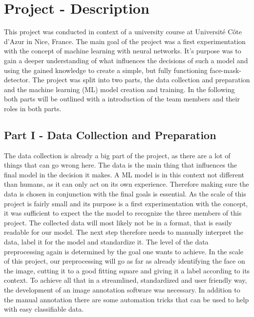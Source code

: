 
\section{Project - Description}

This project was conducted in context of a university course at Université Côte
d'Azur in Nice, France. The main goal of the project was a first experimentation
with the concept of machine learning with neural networks. It's purpose was to
gain a deeper understanding of what influences the decisions of such a model and
using the gained knowledge to create a simple, but fully functioning
face-mask-detector.
\newline
The project was split into two parts, the data collection and preparation and
the machine learning (ML) model creation and training. In the following both
parts will be outlined with a introduction of the team members and their roles
in both parts.

\subsection{Part I - Data Collection and Preparation}

The data collection is already a big part of the project, as there are a lot of
things that can go wrong here. The data is the main thing that influences the
final model in the decision it makes. A ML model is in this context not
different than humans, as it can only act on its own experience. Therefore
making sure the data is chosen in conjunction with the final goals is essential.
As the scale of this project is fairly small and its purpose is a first
experimentation with the concept, it was sufficient to expect the the model to
recognize the three members of this project.
\newline
The collected data will most likely not be in a format, that is easily readable
for our model. The next step therefore needs to manually interpret the data,
label it for the model and standardize it. The level of the data preprocessing
again is determined by the goal one wants to achieve. In the scale of this
project, our preprocessing will go as far as already identifying the face on the
image, cutting it to a good fitting square and giving it a label according to
its context.
\newline
To achieve all that in a streamlined, standardized and user friendly way, the
development of an image annotation software was necessary. In addition to the
manual annotation there are some automation tricks that can be used to help with
easy classifiable data. 

